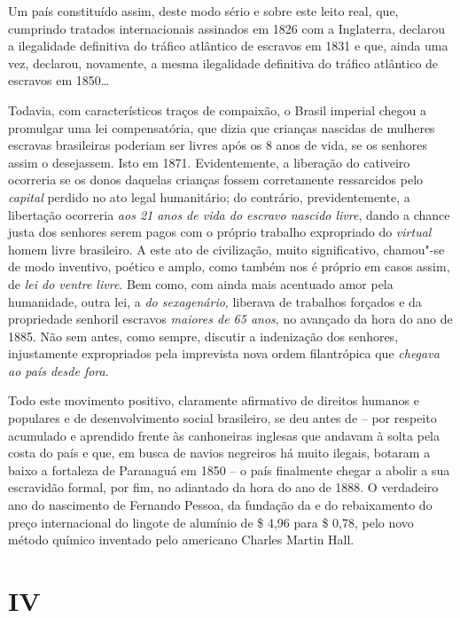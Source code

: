 Um país constituído assim, deste modo sério e sobre este leito real,
que, cumprindo tratados internacionais assinados em 1826 com a
Inglaterra, declarou a ilegalidade definitiva do tráfico atlântico de
escravos em 1831 e que, ainda uma vez, declarou, novamente, a mesma
ilegalidade definitiva do tráfico atlântico de escravos em 1850\ldots{}

Todavia, com característicos traços de compaixão, o Brasil imperial
chegou a promulgar uma lei compensatória, que dizia que crianças
nascidas de mulheres escravas brasileiras poderiam ser livres após os 8
anos de vida, se os senhores assim o desejassem. Isto em 1871.
Evidentemente, a liberação do cativeiro ocorreria se os donos daquelas
crianças fossem corretamente ressarcidos pelo \emph{capital} perdido no
ato legal humanitário; do contrário, previdentemente, a libertação
ocorreria \emph{aos 21 anos de vida do escravo nascido livre}, dando a
chance justa dos senhores serem pagos com o próprio trabalho expropriado
do \emph{virtual} homem livre brasileiro. A este ato de civilização,
muito significativo, chamou"-se de modo inventivo, poético e amplo, como
também nos é próprio em casos assim, de \emph{lei do ventre livre}. Bem
como, com ainda mais acentuado amor pela humanidade, outra lei, a
\emph{do sexagenário}, liberava de trabalhos forçados e da propriedade
senhoril escravos \emph{maiores de 65 anos}, no avançado da hora do ano
de 1885. Não sem antes, como sempre, discutir a indenização dos
senhores, injustamente expropriados pela imprevista nova ordem
filantrópica que \emph{chegava ao país desde fora}.

Todo este movimento positivo, claramente afirmativo de direitos humanos
e populares e de desenvolvimento social brasileiro, se deu antes de --
por respeito acumulado e aprendido frente às canhoneiras inglesas que
andavam à solta pela costa do país e que, em busca de navios negreiros
há muito ilegais, botaram a baixo a fortaleza de Paranaguá em 1850 -- o
país finalmente chegar a abolir a sua escravidão formal, por fim, no
adiantado da hora do ano de 1888. O verdadeiro ano do nascimento de
Fernando Pessoa, da fundação da  e do rebaixamento do preço
internacional do lingote de alumínio de \$ 4,96 para \$ 0,78, pelo
novo método químico inventado pelo americano Charles Martin Hall.

\section{IV}


